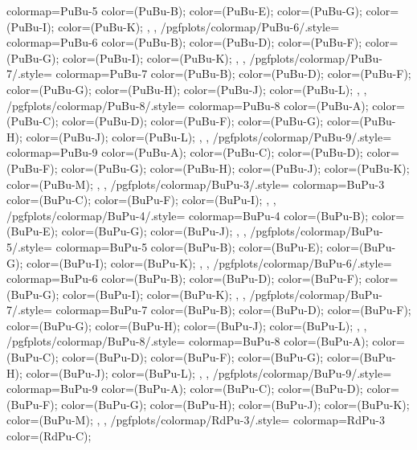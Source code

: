{{    colormap={PuBu-5}{
      color=(PuBu-B);
      color=(PuBu-E);
      color=(PuBu-G);
      color=(PuBu-I);
      color=(PuBu-K);
    },
  },
  /pgfplots/colormap/PuBu-6/.style={
    colormap={PuBu-6}{
      color=(PuBu-B);
      color=(PuBu-D);
      color=(PuBu-F);
      color=(PuBu-G);
      color=(PuBu-I);
      color=(PuBu-K);
    },
  },
  /pgfplots/colormap/PuBu-7/.style={
    colormap={PuBu-7}{
      color=(PuBu-B);
      color=(PuBu-D);
      color=(PuBu-F);
      color=(PuBu-G);
      color=(PuBu-H);
      color=(PuBu-J);
      color=(PuBu-L);
    },
  },
  /pgfplots/colormap/PuBu-8/.style={
    colormap={PuBu-8}{
      color=(PuBu-A);
      color=(PuBu-C);
      color=(PuBu-D);
      color=(PuBu-F);
      color=(PuBu-G);
      color=(PuBu-H);
      color=(PuBu-J);
      color=(PuBu-L);
    },
  },
  /pgfplots/colormap/PuBu-9/.style={
    colormap={PuBu-9}{
      color=(PuBu-A);
      color=(PuBu-C);
      color=(PuBu-D);
      color=(PuBu-F);
      color=(PuBu-G);
      color=(PuBu-H);
      color=(PuBu-J);
      color=(PuBu-K);
      color=(PuBu-M);
    },
  },
  /pgfplots/colormap/BuPu-3/.style={
    colormap={BuPu-3}{
      color=(BuPu-C);
      color=(BuPu-F);
      color=(BuPu-I);
    },
  },
  /pgfplots/colormap/BuPu-4/.style={
    colormap={BuPu-4}{
      color=(BuPu-B);
      color=(BuPu-E);
      color=(BuPu-G);
      color=(BuPu-J);
    },
  },
  /pgfplots/colormap/BuPu-5/.style={
    colormap={BuPu-5}{
      color=(BuPu-B);
      color=(BuPu-E);
      color=(BuPu-G);
      color=(BuPu-I);
      color=(BuPu-K);
    },
  },
  /pgfplots/colormap/BuPu-6/.style={
    colormap={BuPu-6}{
      color=(BuPu-B);
      color=(BuPu-D);
      color=(BuPu-F);
      color=(BuPu-G);
      color=(BuPu-I);
      color=(BuPu-K);
    },
  },
  /pgfplots/colormap/BuPu-7/.style={
    colormap={BuPu-7}{
      color=(BuPu-B);
      color=(BuPu-D);
      color=(BuPu-F);
      color=(BuPu-G);
      color=(BuPu-H);
      color=(BuPu-J);
      color=(BuPu-L);
    },
  },
  /pgfplots/colormap/BuPu-8/.style={
    colormap={BuPu-8}{
      color=(BuPu-A);
      color=(BuPu-C);
      color=(BuPu-D);
      color=(BuPu-F);
      color=(BuPu-G);
      color=(BuPu-H);
      color=(BuPu-J);
      color=(BuPu-L);
    },
  },
  /pgfplots/colormap/BuPu-9/.style={
    colormap={BuPu-9}{
      color=(BuPu-A);
      color=(BuPu-C);
      color=(BuPu-D);
      color=(BuPu-F);
      color=(BuPu-G);
      color=(BuPu-H);
      color=(BuPu-J);
      color=(BuPu-K);
      color=(BuPu-M);
    },
  },
  /pgfplots/colormap/RdPu-3/.style={
    colormap={RdPu-3}{
      color=(RdPu-C);
}}}
